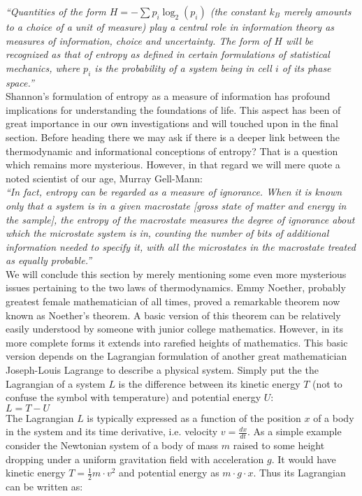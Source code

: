 \documentclass[11pt]{article} %
\numberwithin{equation}{section}
\begin{document}
\textit{“Quantities of the form $H=-\sum p_i \log_2(p_i)$ (the constant $k_B$ merely amounts to a choice of a unit of measure) play a central role in information theory as measures of information, choice and uncertainty. The form of $H$ will be recognized as that of entropy as defined in certain formulations of statistical mechanics, where $p_i$ is the probability of a system being in cell $i$ of its phase space.”}\\

Shannon’s formulation of entropy as a measure of information has profound implications for understanding the foundations of life. This aspect has been of great importance in our own investigations and will touched upon in the final section. Before heading there we may ask if there is a deeper link between the thermodynamic and informational conceptions of entropy? That is a question which remains more mysterious. However, in that regard we will mere quote a noted scientist of our age, Murray Gell-Mann:\\

\textit{“In fact, entropy can be regarded as a measure of ignorance. When it is known only that a system is in a given macrostate [gross state of matter and energy in the sample], the entropy of the macrostate measures the degree of ignorance about which the microstate system is in, counting the number of bits of additional information needed to specify it, with all the microstates in the macrostate treated as equally probable.”}\\

We will conclude this section by merely mentioning some even more mysterious issues pertaining to the two laws of thermodynamics. Emmy Noether, probably greatest female mathematician of all times, proved a remarkable theorem now known as Noether’s theorem. A basic version of this theorem can be relatively easily understood by someone with junior college mathematics. However, in its more complete forms it extends into rarefied heights of mathematics. This basic version depends on the Lagrangian formulation of another great mathematician Joseph-Louis Lagrange to describe a physical system. Simply put the the Lagrangian of a system $L$ is the difference between its kinetic energy $T$ (not to confuse the symbol with temperature) and potential energy $U$:\\
 $L=T-U$\\
 
The Lagrangian $L$ is typically expressed as a function of the position $x$ of a body in the system and its time derivative, i.e. velocity $v=\tfrac{dx}{dt}$. As a simple example consider the Newtonian system of a body of mass $m$ raised to some height dropping under a uniform gravitation field with acceleration $g$. It would have kinetic energy $T=\tfrac{1}{2}m \cdot v^2$ and potential energy as $m\cdot g \cdot x$. Thus its Lagrangian can be written as:\\
\end{document}

